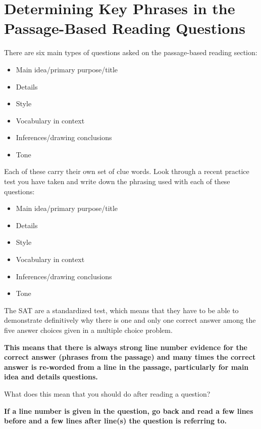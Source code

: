 \section{\sloppy Determining Key Phrases in the Passage-Based Reading Questions}

There are six main types of questions asked on the passage-based reading section:

\begin{itemize}
\item Main idea/primary purpose/title
\item Details
\item Style
\item Vocabulary in context
\item Inferences/drawing conclusions
\item Tone
\end{itemize}

\bigskip
Each of these carry their own set of clue words. Look through a recent practice test you have taken and write down the phrasing used with each of these questions:

\begin{itemize}
\item Main idea/primary purpose/title \hrulefill
\item Details \hrulefill
\item Style \hrulefill
\item Vocabulary in context \hrulefill
\item Inferences/drawing conclusions \hrulefill
\item Tone \hrulefill
\end{itemize}

\bigskip
The SAT are a standardized test, which means that they have to be able to demonstrate definitively why there is one and only one correct answer among the five answer choices given in a multiple choice problem. 

\bigskip
\textbf{\large This means that there is always strong line number evidence for the correct answer (phrases from the passage) and many times the correct answer is re-worded from a line in the passage, particularly for main idea and details questions.} 

What does this mean that you should do after reading a question?

\bigskip
\textbf{\large If a line number is given in the question, go back and read a few lines before and a few lines after line(s) the question is referring to.}

